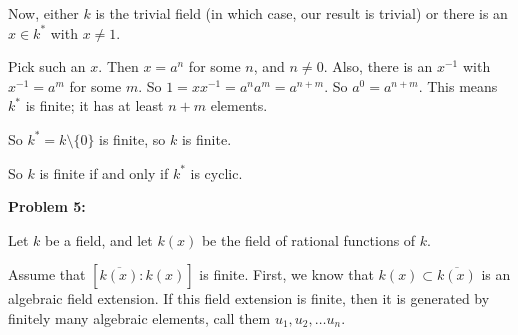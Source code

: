\documentclass[a4paper,12pt]{article}
\newcommand{\shunt}{\vspace{20mm}}
\begin{document}
Now, either $k$ is the trivial field (in which case, our result is trivial) or there is an $x \in k^*$ with $x \neq 1$.

Pick such an $x$. Then $x = a^n$ for some $n$, and $n \neq 0$. Also, there is an $x^{-1}$ with $x^{-1} =a^m$ for some $m$. So $1= xx^{-1} = a^na^m = a^{n+m}$. So $a^0=a^{n+m}$. This means $k^*$ is finite; it has at least $n+m$ elements.

So $k^* = k \setminus \{0\}$ is finite, so $k$ is finite.

So $k$ is finite if and only if $k^*$ is cyclic.

\shunt

{\bf Problem 5:} 

Let $k$ be a field, and let $k(x)$ be the field of rational functions of $k$.

Assume that $[\overline{k(x)}:k(x)]$ is finite. First, we know that $k(x) \subset \overline{k(x)}$ is an algebraic field extension. If this field extension is finite, then it is generated by finitely many algebraic elements, call them $u_1,u_2, \ldots u_n$. 




\shunt
\end{document}
